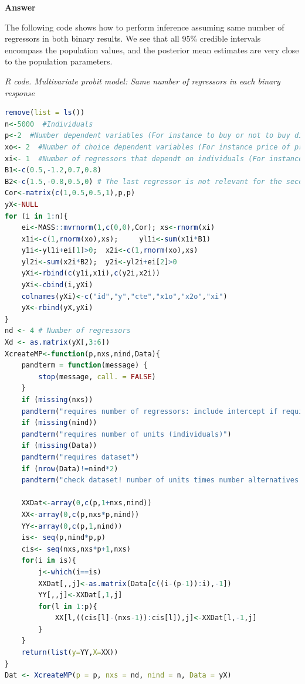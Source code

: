\begin{enumerate}[leftmargin=*]
\textbf{Answer}

The following code shows how to perform inference assuming same number of regressors in both binary results. We see that all 95\% credible intervals encompass the population values, and the posterior mean estimates are very close to the population parameters. 

\begin{tcolorbox}[enhanced,width=4.67in,center upper,
	fontupper=\large\bfseries,drop shadow southwest,sharp corners]
	\textit{R code. Multivariate probit model: Same number of regressors in each binary response}
	\begin{VF}
		\begin{lstlisting}[language=R]
remove(list = ls())
n<-5000  #Individuals
p<-2  #Number dependent variables (For instance to buy or not to buy different products)
xo<- 2  #Number of choice dependent variables (For instance price of products)
xi<- 1  #Number of regressors that dependt on individuals (For instance income)
B1<-c(0.5,-1.2,0.7,0.8)
B2<-c(1.5,-0.8,0.5,0) # The last regressor is not relevant for the second product
Cor<-matrix(c(1,0.5,0.5,1),p,p)
yX<-NULL
for (i in 1:n){
	ei<-MASS::mvrnorm(1,c(0,0),Cor); xs<-rnorm(xi)
	x1i<-c(1,rnorm(xo),xs); 	yl1i<-sum(x1i*B1)
	y1i<-yl1i+ei[1]>0; 	x2i<-c(1,rnorm(xo),xs)
	yl2i<-sum(x2i*B2); 	y2i<-yl2i+ei[2]>0
	yXi<-rbind(c(y1i,x1i),c(y2i,x2i))
	yXi<-cbind(i,yXi)
	colnames(yXi)<-c("id","y","cte","x1o","x2o","xi")
	yX<-rbind(yX,yXi)
}
nd <- 4 # Number of regressors
Xd <- as.matrix(yX[,3:6])
XcreateMP<-function(p,nxs,nind,Data){
	pandterm = function(message) {
		stop(message, call. = FALSE)
	}
	if (missing(nxs)) 
	pandterm("requires number of regressors: include intercept if required")
	if (missing(nind)) 
	pandterm("requires number of units (individuals)")
	if (missing(Data)) 
	pandterm("requires dataset")
	if (nrow(Data)!=nind*2)
	pandterm("check dataset! number of units times number alternatives should be equal to dataset rows")
	
	XXDat<-array(0,c(p,1+nxs,nind))
	XX<-array(0,c(p,nxs*p,nind))
	YY<-array(0,c(p,1,nind))
	is<- seq(p,nind*p,p)
	cis<- seq(nxs,nxs*p+1,nxs)
	for(i in is){
		j<-which(i==is)
		XXDat[,,j]<-as.matrix(Data[c((i-(p-1)):i),-1])
		YY[,,j]<-XXDat[,1,j]
		for(l in 1:p){
			XX[l,((cis[l]-(nxs-1)):cis[l]),j]<-XXDat[l,-1,j]
		}
	}
	return(list(y=YY,X=XX))
}
Dat <- XcreateMP(p = p, nxs = nd, nind = n, Data = yX)
\end{lstlisting}
	\end{VF}
\end{tcolorbox}


\end{enumerate}
